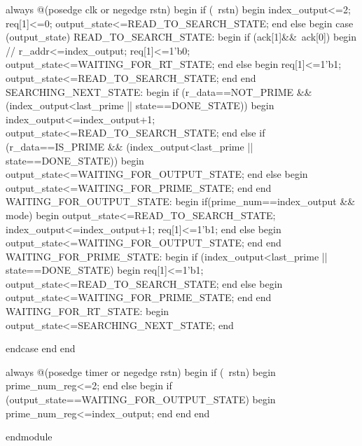 \documentclass[a4paper]{article}
\begin{document}
\begin{tcblisting}
        always @(posedge clk or negedge rstn) begin
            if (~rstn) begin
                index_output<=2;
                req[1]<=0;
                output_state<=READ_TO_SEARCH_STATE;
            end else begin
                case (output_state)
                    READ_TO_SEARCH_STATE: begin
                        if (ack[1]&&~ack[0]) begin
                            // r_addr<=index_output;
                            req[1]<=1'b0;
                            output_state<=WAITING_FOR_RT_STATE;
                        end else begin
                            req[1]<=1'b1;
                            output_state<=READ_TO_SEARCH_STATE;
                        end
                    end
                    SEARCHING_NEXT_STATE: begin
                        if (r_data==NOT_PRIME && (index_output<last_prime || state==DONE_STATE)) begin
                            index_output<=index_output+1;
                            output_state<=READ_TO_SEARCH_STATE;
                        end else if (r_data==IS_PRIME && (index_output<last_prime || state==DONE_STATE)) begin
                            output_state<=WAITING_FOR_OUTPUT_STATE;
                        end else begin
                            output_state<=WAITING_FOR_PRIME_STATE;
                        end
                    end
                    WAITING_FOR_OUTPUT_STATE: begin
                        if(prime_num==index_output && mode) begin
                            output_state<=READ_TO_SEARCH_STATE;
                            index_output<=index_output+1;
                            req[1]<=1'b1;
                        end else begin
                            output_state<=WAITING_FOR_OUTPUT_STATE;
                        end
                    end
                    WAITING_FOR_PRIME_STATE: begin
                        if (index_output<last_prime || state==DONE_STATE) begin
                            req[1]<=1'b1;
                            output_state<=READ_TO_SEARCH_STATE;
                        end else begin
                            output_state<=WAITING_FOR_PRIME_STATE;
                        end
                    end
                    WAITING_FOR_RT_STATE: begin
                        output_state<=SEARCHING_NEXT_STATE;
                    end

                endcase
            end
        end

        always @(posedge timer or negedge rstn) begin
            if (~rstn) begin
                prime_num_reg<=2;
            end else begin
                if (output_state==WAITING_FOR_OUTPUT_STATE) begin
                    prime_num_reg<=index_output;
                end
            end
        end

    endmodule
\end{tcblisting}
\end{document}
